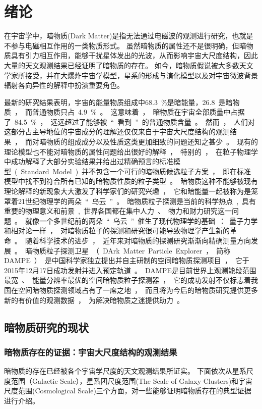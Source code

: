 \chapter{绪论}
\label{ch:introduction}

在宇宙学中，暗物质(Dark Matter)是指无法通过电磁波的观测进行研究，也就是不参与电磁相互作用的一类物质形式。
虽然暗物质的属性还不是很明确，但暗物质具有引力相互作用，能够干扰星体发出的光波，从而影响宇宙大尺度结构，因此大量的天文观测结果已经证明了暗物质的存在。
如今，暗物质假说被大多数天文学家所接受，并在大爆炸宇宙学模型，星系的形成与演化模型以及对宇宙微波背景辐射各向异性的解释中扮演重要角色。

最新的研究结果表明\parencite{planck_collaboration_planck_2014}，宇宙的能量物质组成中\SI{68.3}{\percent}是暗能量，\SI{26.8}是暗物质，而普通物质只占\SI{4.9}{\percent}。这意味着，暗物质在宇宙全部质量中占据了\SI{84.5}{\percent}，远远超过了能够被“看到”的普通物质含量。
然而，人们对这部分占主导地位的宇宙成分的理解还仅仅来自于宇宙大尺度结构的观测结果，而对暗物质的组成成分以及性质这类更加细致的问题还知之甚少。
现有的理论模型也不能对暗物质的属性问题给出很好的解释，特别的，在粒子物理学中成功解释了大部分实验结果并给出过精确预言的标准模型(Standard Model)并不包含一个可行的暗物质候选粒子方案，即在标准模型中找不到符合所有已知的暗物质性质的粒子类型。
暗物质这种不能够被现有理论解释的新现象大大激发了科学家们的研究兴趣，它和暗能量一起被称为是笼罩着21世纪物理学的两朵“乌云”。
暗物质粒子探测是当前的科学热点, 具有重要的物理意义和前景, 世界各国都在集中人力、物力和财力研究这一问题。
就像一个多世纪前的两朵“乌云”催生了现代物理学的基础：量子力学和相对论一样，对暗物质粒子的探测和研究很可能导致物理学产生新的革命。

随着科学技术的进步，近年来对暗物质的探测研究渐渐向精确测量方向发展。
暗物质粒子探测卫星（DArk Matter Particle Explorer，简称DAMPE）是中国科学家独立提出并自主研制的空间暗物质探测项目，它于2015年12月17日成功发射并进入预定轨道。
DAMPE是目前世界上观测能段范围最宽、能量分辨率最优的空间暗物质粒子探测器，它的成功发射不仅标志着我国在空间暗物质探测领域占有了一席之地，而且将为今后的暗物质研究提供更多新的有价值的观测数据，为解决暗物质之迷提供助力。

\section{暗物质研究的现状}
\subsection{暗物质存在的证据：宇宙大尺度结构的观测结果}
暗物质的存在已经被各个宇宙学尺度的天文观测结果所证实。
下面依次从星系尺度范围（Galactic Scale），星系团尺度范围(The Scale of Galaxy Clusters)和宇宙尺度范围(Cosmological Scale)三个方面，对一些能够证明暗物质存在的典型证据进行介绍。

